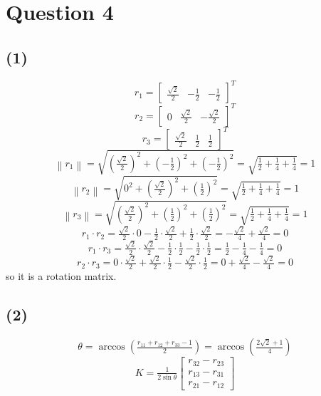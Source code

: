 \documentclass{article}
\begin{document}
\section*{Question 4} %
\subsection*{(1)}
\begin{enumerate}
    \[
        r_{1} = 
        \begin{bmatrix}
            \tfrac{\sqrt{2}}{2} & -\tfrac{1}{2} & -\tfrac{1}{2}
        \end{bmatrix}
        ^T
    \]
    \[
        r_{2} = 
        \begin{bmatrix}
            0 & \tfrac{\sqrt{2}}{2} & -\tfrac{\sqrt{2}}{2}
        \end{bmatrix}
        ^T
    \]
    \[
        r_{3} =
        \begin{bmatrix}
            \tfrac{\sqrt{2}}{2} & \tfrac{1}{2} & \tfrac{1}{2}
        \end{bmatrix}
        ^T
    \]
    \[
        \left\|r_{1}\right\| = 
        \sqrt{(\tfrac{\sqrt{2}}{2})^2 + (-\tfrac{1}2{})^2 + (-\tfrac{1}{2})^2} = \sqrt{\tfrac{1}{2} + \tfrac{1}{4} + \tfrac{1}{4}} = 1
    \]
    \[
        \left\|r_{2}\right\| = 
        \sqrt{0^2 + (\tfrac{\sqrt{2}}{2})^2 + (\tfrac{1}{2})^2} = \sqrt{\tfrac{1}{2} + \tfrac{1}{4} + \tfrac{1}{4}} = 1
    \]
    \[
        \left\|r_{3}\right\| = 
        \sqrt{(\tfrac{\sqrt{2}}{2})^2 + (\tfrac{1}{2})^2 + (\tfrac{1}{2})^2} = \sqrt{\tfrac{1}{2} + \tfrac{1}{4} + \tfrac{1}{4}} = 1
    \]
    \[
        r_{1} \cdot r_{2} = \tfrac{\sqrt{2}}{2} \cdot 0 - \tfrac{1}{2} \cdot \tfrac{\sqrt{2}}{2} + \tfrac{1}{2} \cdot \tfrac{\sqrt{2}}{2} = -\tfrac{\sqrt{2}}{4} + \tfrac{\sqrt{2}}{4} = 0
    \]
    \[
        r_{1} \cdot r_{3} = 
        \tfrac{\sqrt{2}}{2} \cdot \tfrac{\sqrt{2}}{2} - \tfrac{1}{2} \cdot \tfrac{1}{2} - \tfrac{1}{2} \cdot \tfrac{1}{2} = \tfrac{1}{2} - \tfrac{1}{4} - \tfrac{1}{4} = 0
    \]
    \[
        r_{2} \cdot r_{3} = 0 \cdot \tfrac{\sqrt{2}}{2} + \tfrac{\sqrt{2}}{2} \cdot \tfrac{1}{2} - \tfrac{\sqrt{2}}{2} \cdot \tfrac{1}{2} = 0 + \tfrac{\sqrt{2}}{4} - \tfrac{\sqrt{2}}{4} = 0
    \]
    so it is a rotation matrix.
\end{enumerate}
\subsection*{(2)}
\begin{enumerate}

    \[
        \theta = \arccos({\tfrac{r_{11} + r_{12} + r_{33} - 1}{2}})
        = 
        \arccos(\tfrac{2\sqrt{2} + 1 }{4})
    \]
    \[
        K = \tfrac{1}{2\sin{\theta}}
        \begin{bmatrix}
            r_{32} - r_{23} \\
            r_{13} - r_{31} \\
            r_{21} - r_{12}
        \end{bmatrix}
    \]
\end{enumerate}
\end{document}
